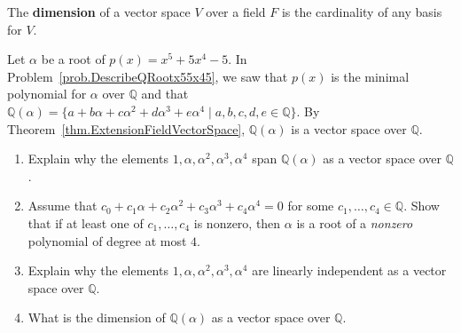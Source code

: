 \begin{definition}
The \textbf{dimension} of a vector space $V$ over a field $F$ is the cardinality of any basis for $V$.
\end{definition}


\begin{problem}
Let $\alpha$ be a root of $p(x) = x^5 + 5x^4 - 5$. In Problem~\ref{prob.DescribeQRootx55x45}, we saw that $p(x)$ is the minimal polynomial for $\alpha$ over $\mathbb{Q}$ and that $\mathbb{Q}(\alpha)= \{a + b\alpha + c\alpha^2 + d\alpha^3 + e\alpha^4\mid a,b,c,d,e\in \mathbb{Q}\}$. By Theorem~\ref{thm.ExtensionFieldVectorSpace}, $\mathbb{Q}(\alpha)$ is a vector space over $\mathbb{Q}$.
\begin{enumerate}
\item Explain why the elements $1,\alpha,\alpha^2,\alpha^3,\alpha^4$ span $\mathbb{Q}(\alpha)$ as a vector space over $\mathbb{Q}$.
\item Assume that $c_0+c_1\alpha+c_2\alpha^2+c_3\alpha^3+c_4\alpha^4 = 0$ for some $c_1,\ldots,c_4\in \mathbb{Q}$. Show that if at least one of  $c_1,\ldots,c_4$ is nonzero, then $\alpha$ is a root of a \emph{nonzero} polynomial of degree at most $4$.
\item Explain why the elements $1,\alpha,\alpha^2,\alpha^3,\alpha^4$ are linearly independent as a vector space over $\mathbb{Q}$.
\item What is the dimension of $\mathbb{Q}(\alpha)$ as a vector space over $\mathbb{Q}$.
\end{enumerate}
\end{problem}




